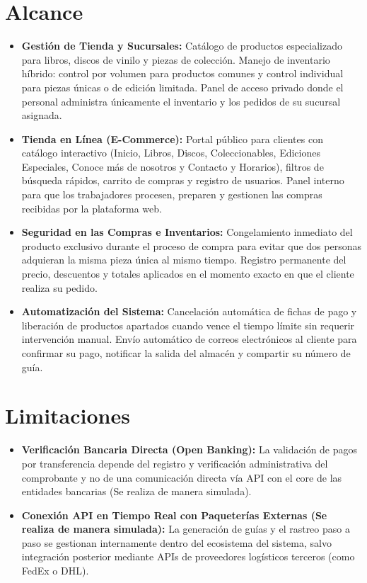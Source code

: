 \section{Alcance}
\begin{itemize}
    \item \textbf{Gestión de Tienda y Sucursales:} Catálogo de productos especializado para libros, discos de vinilo y piezas de colección. Manejo de inventario híbrido: control por volumen para productos comunes y control individual para piezas únicas o de edición limitada. Panel de acceso privado donde el personal administra únicamente el inventario y los pedidos de su sucursal asignada.
    \item \textbf{Tienda en Línea (E-Commerce):} Portal público para clientes con catálogo interactivo (Inicio, Libros, Discos, Coleccionables, Ediciones Especiales, Conoce más de nosotros y Contacto y Horarios), filtros de búsqueda rápidos, carrito de compras y registro de usuarios. Panel interno para que los trabajadores procesen, preparen y gestionen las compras recibidas por la plataforma web.
    \item \textbf{Seguridad en las Compras e Inventarios:} Congelamiento inmediato del producto exclusivo durante el proceso de compra para evitar que dos personas adquieran la misma pieza única al mismo tiempo. Registro permanente del precio, descuentos y totales aplicados en el momento exacto en que el cliente realiza su pedido.
    \item \textbf{Automatización del Sistema:} Cancelación automática de fichas de pago y liberación de productos apartados cuando vence el tiempo límite sin requerir intervención manual. Envío automático de correos electrónicos al cliente para confirmar su pago, notificar la salida del almacén y compartir su número de guía.
\end{itemize}

\section{Limitaciones}
\begin{itemize}
    \item \textbf{Verificación Bancaria Directa (Open Banking):} La validación de pagos por transferencia depende del registro y verificación administrativa del comprobante y no de una comunicación directa vía API con el core de las entidades bancarias (Se realiza de manera simulada).
    \item \textbf{Conexión API en Tiempo Real con Paqueterías Externas (Se realiza de manera simulada):} La generación de guías y el rastreo paso a paso se gestionan internamente dentro del ecosistema del sistema, salvo integración posterior mediante APIs de proveedores logísticos terceros (como FedEx o DHL).
\end{itemize}

